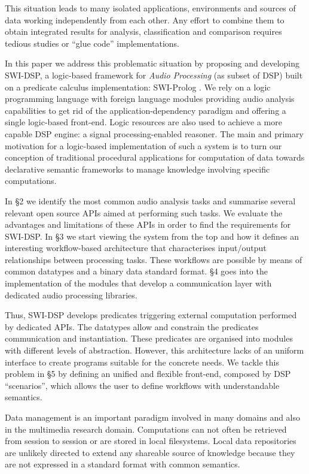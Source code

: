 \documentclass[runningheads]{llncs}
\begin{document}
This situation leads to many isolated applications, environments and sources of data working independently from each other. Any effort to combine them to obtain integrated results for analysis, classification and comparison requires tedious studies or ``glue code'' implementations.

In this paper we address this problematic situation by proposing and developing SWI-DSP, a logic-based framework for \textit{Audio Processing} (as subset of DSP) built on a predicate calculus implementation: SWI-Prolog \cite{swi}. We rely on a logic programming language with foreign language modules providing audio analysis capabilities to get rid of the application-dependency paradigm and offering a single logic-based front-end. Logic resources are also used to achieve a more capable DSP engine: a signal processing-enabled reasoner. The main and primary motivation for a logic-based implementation of such a system is to turn our conception of traditional procedural applications for computation of data towards declarative semantic frameworks to manage knowledge involving specific computations.

In \S 2 we identify the most common audio analysis tasks and summarise several relevant open source APIs aimed at performing such tasks. We evaluate the advantages and limitations of these APIs in order to find the requirements for SWI-DSP. In \S 3 we start viewing the system from the top and how it defines an interesting workflow-based architecture that characterises input/output relationships between processing tasks. These workflows are possible by means of common datatypes and a binary data standard format. \S 4 goes into the implementation of the modules that develop a communication layer with dedicated audio processing libraries.

Thus, SWI-DSP develops predicates triggering external computation performed by dedicated APIs. The datatypes allow and constrain the predicates communication and instantiation. These predicates are organised into modules with different levels of abstraction. However, this architecture lacks of an uniform interface to create programs suitable for the concrete needs. We tackle this problem in \S 5 by defining an unified and flexible front-end, composed by DSP ``scenarios'', which allows the user to define workflows with understandable semantics.

Data management is an important paradigm involved in many domains and also in the multimedia research domain. Computations can not often be retrieved from session to session or are stored in local filesystems. Local data repositories are unlikely directed to extend any shareable source of knowledge because they are not expressed in a standard format with common semantics.
\end{document}
